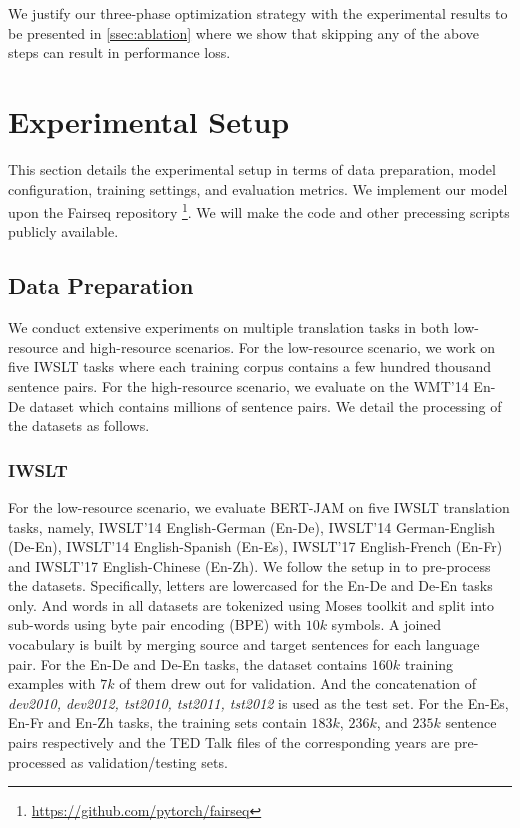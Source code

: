 \documentclass[review]{elsarticle}
\begin{document}
We justify our three-phase optimization strategy with the experimental results to be presented in \cref{ssec:ablation} where we show that skipping any of the above steps can result in performance loss.

\section{Experimental Setup}
\label{sec:setup}
This section details the experimental setup in terms of data preparation, model configuration, training settings, and evaluation metrics. We implement our model upon the Fairseq repository \footnote{\url{https://github.com/pytorch/fairseq}}.
We will make the code and other precessing scripts publicly available. 


\subsection{Data Preparation}
We conduct extensive experiments on multiple translation tasks in both low-resource and high-resource scenarios. For the low-resource scenario, we work on five IWSLT tasks where each training corpus contains a few hundred thousand sentence pairs. For the high-resource scenario, we evaluate on the WMT'14 En-De dataset which contains millions of sentence pairs. We detail the processing of the datasets as follows.

\subsubsection{IWSLT}
For the low-resource scenario, we evaluate BERT-JAM on five IWSLT translation tasks, namely, IWSLT'14 English-German (En-De), IWSLT'14 German-English (De-En), IWSLT'14 English-Spanish (En-Es), IWSLT'17 English-French (En-Fr) and IWSLT'17 English-Chinese (En-Zh). 
We follow the setup in \cite{Zhu20} to pre-process the datasets.
Specifically, letters are lowercased for the En-De and De-En tasks only. And words in all datasets are tokenized using Moses toolkit \cite{Koehn07} and split into sub-words using byte pair encoding (BPE) \cite{Sennrich16} with $10k$ symbols. A joined vocabulary is built by merging source and target sentences for each language pair. For the En-De and De-En tasks, the dataset contains $160k$ training examples with $7k$ of them drew out for validation. And the concatenation of \emph{dev2010, dev2012, tst2010, tst2011, tst2012} is used as the test set. For the En-Es, En-Fr and En-Zh tasks, the training sets contain $183k$, $236k$, and $235k$ sentence pairs respectively and the TED Talk files of the corresponding years are pre-processed as validation/testing sets. 
\end{document}
